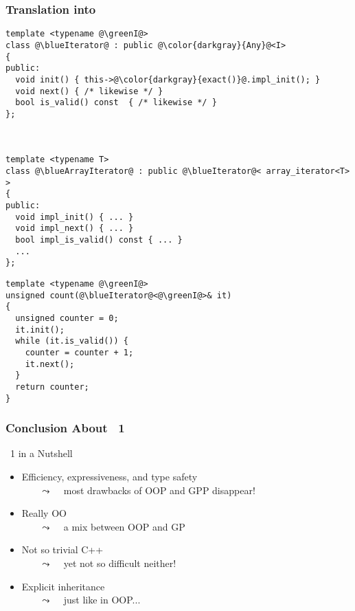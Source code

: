 \begin{frame}[fragile]
  \frametitle{Translation into }

\begin{multicols}{2}
%
\begin{lstlisting}[escapechar=@]
template <typename @\greenI@>
class @\blueIterator@ : public @\color{darkgray}{Any}@<I>
{
public:
  void init() { this->@\color{darkgray}{exact()}@.impl_init(); }
  void next() { /* likewise */ }
  bool is_valid() const  { /* likewise */ }
};



template <typename T>
class @\blueArrayIterator@ : public @\blueIterator@< array_iterator<T> >
{
public:
  void impl_init() { ... }
  void impl_next() { ... }
  bool impl_is_valid() const { ... }
  ...
};
\end{lstlisting}
%
\columnbreak
%
\begin{lstlisting}[escapechar=@]
template <typename @\greenI@>
unsigned count(@\blueIterator@<@\greenI@>& it)
{
  unsigned counter = 0;
  it.init();
  while (it.is_valid()) {
    counter = counter + 1;
    it.next();
  }
  return counter;
}
\end{lstlisting}
%
\end{multicols}

\end{frame}




\begin{frame}
  \frametitle{Conclusion About \scoop~1}

\begin{block}{\scoop~1 in a Nutshell}
  \begin{itemize}
  \item[\bplus] Efficiency, expressiveness, and type safety \\
    ~~~ {\tiny{$\leadsto$ ~ most drawbacks of OOP and GPP disappear!}}
  \item[\bplus] Really OO \\
    ~~~ {\tiny{$\leadsto$ ~ a mix between OOP and GP}}
  \item[\bminus] Not so trivial C++ \\
    ~~~ {\tiny{$\leadsto$ ~ yet not so difficult neither!}}
  \item[\bminus] Explicit inheritance \\
    ~~~ {\tiny{$\leadsto$ ~ just like in OOP...}}
  \end{itemize}
\end{block}

\end{frame}




